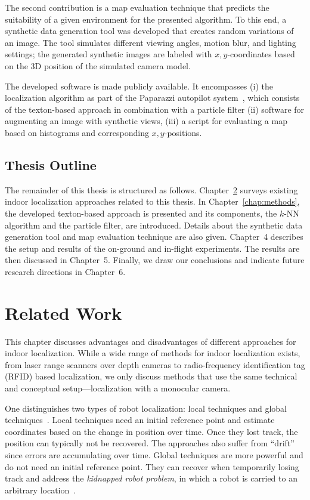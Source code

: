 \documentclass[11pt]{report}
\begin{document}
The second contribution is a map evaluation technique that predicts
the suitability of a given environment for the presented algorithm. To
this end, a synthetic data generation tool was developed that creates
random variations of an image. The tool simulates different viewing
angles, motion blur, and lighting settings; the generated synthetic
images are labeled with $x,y$-coordinates based on the 3D position of
the simulated camera model.

The developed software is made publicly available. It encompasses (i)
the localization algorithm as part of the Paparazzi autopilot
system~\cite{brisset2006paparazzi}, which consists of the texton-based
approach in combination with a particle filter (ii) software for
augmenting an image with synthetic views, (iii) a script for
evaluating a map based on histograms and corresponding
$x,y$-positions.


\section{Thesis Outline}
\label{sec:outline}

The remainder of this thesis is structured as follows.
Chapter~\ref{chap:relatedwork} surveys existing indoor localization
approaches related to this thesis. In Chapter~\ref{chap:methods}, the
developed texton-based approach is presented and its components, the
$k$-NN algorithm and the particle filter, are introduced. Details about
the synthetic data generation tool and map evaluation technique are
also given. Chapter~4 describes the setup and
results of the on-ground and in-flight experiments. The results are
then discussed in Chapter~5. Finally, we draw our
conclusions and indicate future research directions in
Chapter~6.%

\chapter{Related Work}
\label{chap:relatedwork}

This chapter discusses advantages and disadvantages of different
approaches for indoor localization.
While a wide range of methods for indoor localization exists, from
laser range scanners over depth cameras to radio-frequency
identification tag (RFID) based localization, we only discuss methods
that use the same technical and conceptual setup---localization with a
monocular camera.

One distinguishes two types of robot localization: local techniques
and global techniques~\cite{fox1999monte}. Local techniques need an
initial reference point and estimate coordinates based on the change
in position over time. Once they lost track, the position can
typically not be recovered. The approaches also suffer from ``drift''
since errors are accumulating over time. Global techniques are more
powerful and do not need an initial reference point. They can recover
when temporarily losing track and address the \emph{kidnapped robot
  problem}, in which a robot is carried to an arbitrary
location~\cite{engelson1992error}.
\end{document}
